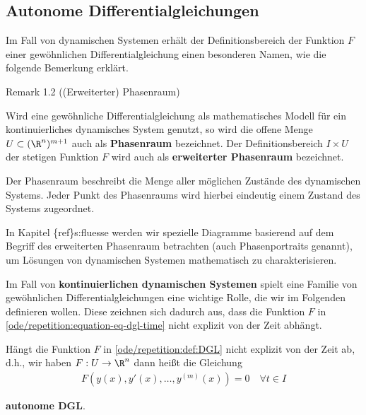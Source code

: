 \documentclass[letterpaper,10pt,english]{jupyterBook}
\begin{document}
\subsection{Autonome Differentialgleichungen}
\label{\detokenize{ode/repetition:autonome-differentialgleichungen}}
\par
Im Fall von dynamischen Systemen erhält der Definitionsbereich der Funktion \(F\) einer gewöhnlichen Differentialgleichung einen besonderen Namen, wie die folgende Bemerkung erklärt.
\label{ode/repetition:remark-2}
\begin{emphBox}{}{}{Remark 1.2 ((Erweiterter) Phasenraum)}



\par
Wird eine gewöhnliche Differentialgleichung als mathematisches Modell für ein kontinuierliches dynamisches System genutzt, so wird die offene Menge \(U\subset (\R^n)^{m+1}\) auch als \textbf{Phasenraum} bezeichnet.
Der Definitionsbereich \(I\times U\) der stetigen Funktion \(F\) wird auch als \textbf{erweiterter Phasenraum} bezeichnet.

\par
Der Phasenraum beschreibt die Menge aller möglichen Zustände des dynamischen Systems.
Jeder Punkt des Phasenraums wird hierbei eindeutig einem Zustand des Systems zugeordnet.

\par
In Kapitel \{ref\}s:fluesse werden wir spezielle Diagramme basierend auf dem Begriff des erweiterten Phasenraum betrachten (auch Phasenportraits genannt), um Lösungen von dynamischen Systemen mathematisch zu charakterisieren.
\end{emphBox}

\par
Im Fall von \textbf{kontinuierlichen dynamischen Systemen} spielt eine Familie von gewöhnlichen Differentialgleichungen eine wichtige Rolle, die wir im Folgenden definieren wollen.
Diese zeichnen sich dadurch aus, dass die Funktion \(F\) in \cref{ode/repetition:equation-eq-dgl-time} nicht explizit von der Zeit abhängt.
\label{ode/repetition:definition-3}
\begin{definition}{}{}



\par
Hängt die Funktion \(F\) in \cref{ode/repetition:def:DGL} nicht explizit von der Zeit ab, d.h., wir haben \(F:U\rightarrow\R^n\) dann heißt die Gleichung
\begin{align}\label{equation:ode/repetition:eq:autonome_DGL}
F(y(x), y'(x), \ldots, y^{(m)}(x)) = 0 \quad \forall t\in I
\end{align}
\par
\textbf{autonome DGL}.
\end{definition}
\end{document}
